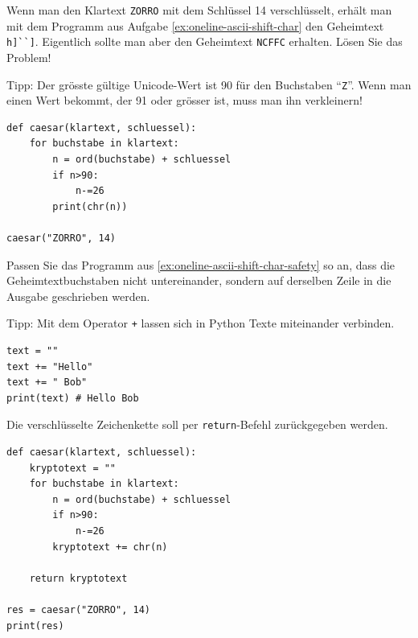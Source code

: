 \begin{myexercise}\label{ex:oneline-ascii-shift-char-safety}
Wenn man den Klartext \texttt{ZORRO} mit dem Schlüssel 14 verschlüsselt, erhält man mit dem Programm aus Aufgabe \cref{ex:oneline-ascii-shift-char} den Geheimtext \lstinline|h]``]|. Eigentlich sollte man aber den Geheimtext \texttt{NCFFC} erhalten. Lösen Sie das Problem!

Tipp: Der grösste gültige Unicode-Wert ist 90 für den Buchstaben \enquote{\texttt{Z}}. Wenn man einen Wert bekommt, der 91 oder grösser ist, muss man ihn verkleinern!

\begin{myanswer}
\begin{lstlisting}
def caesar(klartext, schluessel):
    for buchstabe in klartext:
        n = ord(buchstabe) + schluessel
        if n>90:
            n-=26
        print(chr(n))

caesar("ZORRO", 14)
\end{lstlisting}
\end{myanswer}


\end{myexercise}

\begin{myexercise}\label{ex:oneline-ascii-shift-char-safety-final}
Passen Sie das Programm aus \cref{ex:oneline-ascii-shift-char-safety} so an, dass die Geheimtextbuchstaben nicht untereinander, sondern auf derselben Zeile in die Ausgabe geschrieben werden.

Tipp: Mit dem Operator \texttt{+} lassen sich in Python Texte miteinander verbinden.

\begin{lstlisting}
text = ""
text += "Hello"
text += " Bob"
print(text) # Hello Bob
\end{lstlisting}

Die verschlüsselte Zeichenkette soll per \lstinline|return|-Befehl zurückgegeben werden.

\begin{myanswer}
\begin{lstlisting}
def caesar(klartext, schluessel):
    kryptotext = ""
    for buchstabe in klartext:
        n = ord(buchstabe) + schluessel
        if n>90:
            n-=26
        kryptotext += chr(n)
        
    return kryptotext

res = caesar("ZORRO", 14)
print(res)
\end{lstlisting}
\end{myanswer}
\end{myexercise}

